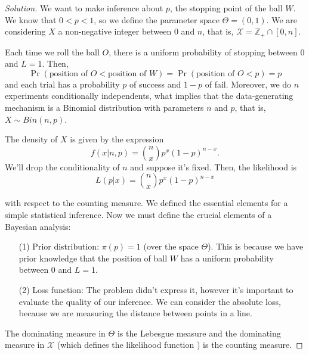 \begin{proof}[Solution]
    We want to make inference about $p$, the stopping point of the ball $W$. We know that $0 < p < 1$, so we define the
    parameter space $\Theta = (0,1)$. We are considering $X$ a non-negative
    integer between $0$ and $n$, that is, $\mathcal{X} = \mathbb{Z}_+ \cap
    [0,n]$. 
    
    Each time we roll the ball $O$, there is a uniform probability of
    stopping between $0$ and $L = 1$. Then, 
    $$\Pr(\text{position of } O < \text{position of } W) = \Pr(\text{position of } O < p) = p$$
    and each trial has a probability $p$ of success and $1-p$ of fail. Moreover,
    we do $n$ experiments conditionally independents, what implies that the
    data-generating mechanism is a Binomial distribution with parameters $n$ and $p$, that is,
    $X \sim Bin(n,p)$. 

    The density of $X$ is given by the expression 
    $$
    f(x|n,p) = \binom{n}{x} p^x(1 - p)^{n-x}.
    $$
    We'll drop the conditionality of $n$ and suppose it's fixed. Then, the
    likelihood is 
    $$
    L(p|x) =  \genfrac(){0pt}{0}{n}{x} p^x(1 - p)^{n-x}
    $$

    with respect to the counting measure. We defined the essential elements
    for a simple statistical inference. Now we must define the crucial elements of a Bayesian analysis: 

    \begin{enumerate}
        \item[(1)] Prior distribution: $\pi(p) = 1$ (over the space $\Theta$).
        This is because we have prior knowledge that the position of ball $W$ has a uniform probability
        between $0$ and $L = 1$. 
        \item[(2)] Loss function: The problem didn't express it, however  it's
        important to evaluate the quality of our inference. We can consider
        the absolute loss, because we are measuring the distance between
        points in a line. 
    \end{enumerate}

    The dominating measure in $\Theta$ is the Lebesgue measure and the
    dominating measure in $\mathcal{X}$ (which defines the likelihood
    function \cite{schervish1996theory}) is the counting measure. 
\end{proof}